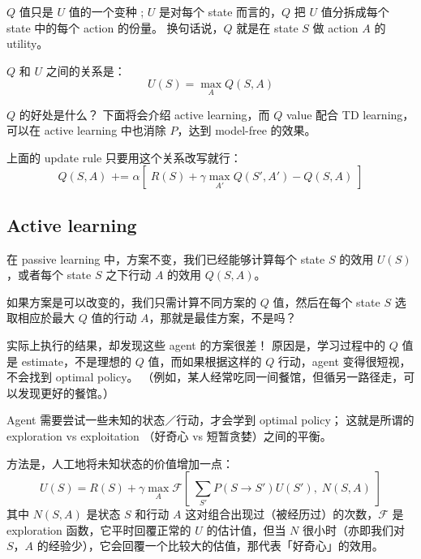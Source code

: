 $Q$ 值只是 $U$ 值的一个变种 ;   $U$ 是对每个 state 而言的，$Q$ 把 $U$ 值分拆成每个 state 中的每个 action 的份量。  换句话说，$Q$ 就是在 state $S$ 做 action $A$ 的 utility。

$Q$ 和 $U$ 之间的关系是：
$$ U(S) = \max_A  Q(S, A) $$

$Q$ 的好处是什么？  下面将会介绍 active learning，而 $Q$ value  配合 TD learning，可以在 active learning 中也消除 $P$，达到 model-free 的效果。

上面的 update rule 只要用这个关系改写就行：
$$ Q(S, A) \mbox{  +=  } \alpha [ \; R(S) + \gamma \max_{A'}  Q(S', A') - Q(S, A) \; ] $$

\subsection{Active learning}

在 passive learning 中，方案不变，我们已经能够计算每个 state $S$ 的效用 $U(S)$，或者每个 state $S$ 之下行动 $A$ 的效用 $Q(S, A)$。

如果方案是可以改变的，我们只需计算不同方案的 $Q$ 值，然后在每个 state $S$ 选取相应於最大 $Q$ 值的行动 $A$，那就是最佳方案，不是吗？

实际上执行的结果，却发现这些 agent 的方案很差！  原因是，学习过程中的 $Q$ 值是 estimate，不是理想的 $Q$ 值，而如果根据这样的 $Q$ 行动，agent 变得很短视，不会找到 optimal policy。  （例如，某人经常吃同一间餐馆，但循另一路径走，可以发现更好的餐馆。）

Agent 需要尝试一些未知的状态／行动，才会学到 optimal policy；  这就是所谓的 exploration vs exploitation （好奇心 vs 短暂贪婪）之间的平衡。

方法是，人工地将未知状态的价值增加一点：
$$ U(S) = R(S) + \gamma \max_A \mathcal{F}[ \; \sum_{S'} P(S \rightarrow S') U(S'), \; N(S, A) \; ] $$
其中 $N(S, A)$ 是状态 $S$ 和行动 $A$ 这对组合出现过（被经历过）的次数，$\mathcal{F}$ 是 exploration 函数，它平时回覆正常的 $U$ 的估计值，但当 $N$ 很小时（亦即我们对 $S$，$A$ 的经验少），它会回覆一个比较大的估值，那代表「好奇心」的效用。





